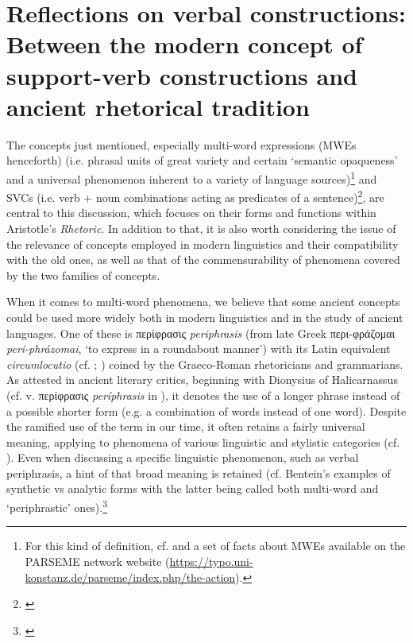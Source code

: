 \documentclass[output=paper,colorlinks,citecolor=brown]{langscibook}
\begin{document}
\section{Reflections on verbal constructions: Between the modern concept of support-verb constructions and ancient rhetorical tradition}\label{Section3Rhet}
\largerpage%
The concepts just mentioned, especially multi-word expressions (MWEs henceforth) (i.e. phrasal units of great variety and certain ‘semantic opaqueness' and a universal phenomenon inherent to a variety of language sources)\footnote{For this kind of definition, cf. \citet{Rayson-etal2010} and a set of facts about MWEs available on the PARSEME network website (\url{https://typo.uni-konstanz.de/parseme/index.php/the-action}).} and SVCs (i.e. verb + noun combinations acting as predicates of a sentence)\footnote{\citet[382]{Fendel2023coptic}}, are central to this discussion, which focuses on their forms and functions within Aristotle’s \textit{Rhetoric}. In addition to that, it is also worth considering the issue of the relevance of concepts employed in modern linguistics and their compatibility with the old ones, as well as that of the commensurability of phenomena covered by the two families of concepts.

When it comes to multi-word phenomena, we believe that some ancient concepts could be used more widely both in modern linguistics and in the study of ancient languages. One of these is περίφρασις \textit{periphrasis} (from late Greek περι-φράζομαι \textit{peri-phrázomai}, ‘to express in a roundabout manner') with its Latin equivalent \textit{circumlocutio} (cf. ; ) coined by the Graeco-Roman rhetoricians and grammarians. As attested in ancient literary critics, beginning with Dionysius of Halicarnassus (cf. v. περίφρασις \textit{períphrasis} in \citealt{Liddell-Scott-Jones1996}), it denotes the use of a longer phrase instead of a possible shorter form (e.g. a combination of words instead of one word). Despite the ramified use of the term in our time, it often retains a fairly universal meaning, applying to phenomena of various linguistic and stylistic categories (cf. \citealt{Haspelmath2000}). Even when discussing a specific linguistic phenomenon, such as verbal periphrasis, a hint of that broad meaning is retained (cf. Bentein’s examples of synthetic vs analytic forms with the latter being called both multi-word and ‘periphrastic' ones).\footnote{\citet[2]{Bentein2016}}
\end{document}
